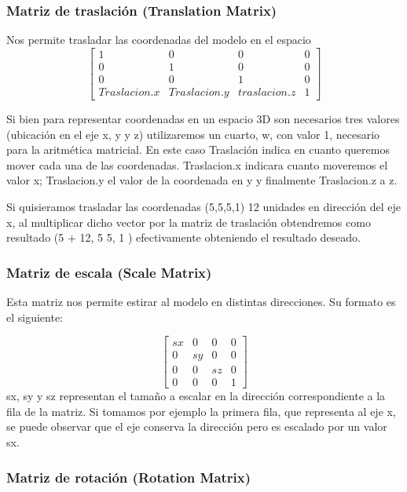 \documentclass[a4paper]{article}
\begin{document}
\subsubsection{Matriz de traslación (Translation Matrix)} 

Nos permite trasladar las coordenadas del modelo en el espacio   
 \[
\begin{bmatrix}
1 & 0 & 0 & 0 \\
0 & 1 & 0 & 0 \\
0 & 0 & 1 & 0 \\
Traslacion.x & Traslacion.y & traslacion.z & 1  
\end{bmatrix}
\]


Si bien para representar  coordenadas en un espacio 3D son necesarios tres valores (ubicación en el eje x, y y z) utilizaremos un cuarto, w, con valor 1, necesario para la aritmética matricial. En este caso Traslación indica en cuanto queremos mover cada una de las coordenadas. Traslacion.x indicara cuanto moveremos el valor x;  Traslacion.y el valor de la coordenada en y y finalmente Traslacion.z a z.
\par Si quisieramos trasladar las coordenadas (5,5,5,1) 12 unidades en dirección del eje x, al multiplicar dicho vector por la matriz de traslación obtendremos como resultado (5 + 12, 5 5, 1 ) efectivamente obteniendo el resultado deseado.  

\subsubsection{Matriz de escala (Scale Matrix)}

Esta matriz nos permite estirar al modelo en distintas direcciones. Su formato es el siguiente:
 
\[
\begin{bmatrix}
sx & 0 & 0 & 0 \\
0 & sy & 0 & 0 \\
0 & 0 & sz & 0 \\
0 & 0 & 0 & 1  
\end{bmatrix}
\]
sx, sy y sz representan el tamaño a escalar en la dirección correspondiente a la fila de la matriz. Si tomamos por ejemplo la primera fila, que representa al eje x, se puede observar que el eje conserva la dirección pero es escalado por un valor sx. 

\subsubsection{Matriz de rotación (Rotation Matrix)}
\end{document}
